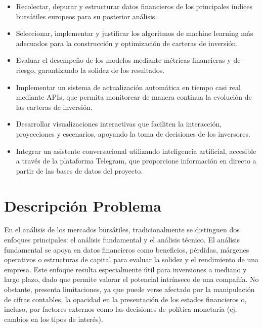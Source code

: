 \documentclass[letterpaper,10pt,spanish]{sphinxmanual}
\begin{document}
\sphinxAtStartPar
{}
\begin{itemize}
\item {} 
\sphinxAtStartPar
Recolectar, depurar y estructurar datos financieros de los principales índices bursátiles europeos para su posterior análisis.

\item {} 
\sphinxAtStartPar
Seleccionar, implementar y justificar los algoritmos de machine learning más adecuados para la construcción y optimización de carteras de inversión.

\item {} 
\sphinxAtStartPar
Evaluar el desempeño de los modelos mediante métricas financieras y de riesgo, garantizando la solidez de los resultados.

\item {} 
\sphinxAtStartPar
Implementar un sistema de actualización automática en tiempo casi real mediante APIs, que permita monitorear de manera continua la evolución de las carteras de inversión.

\item {} 
\sphinxAtStartPar
Desarrollar visualizaciones interactivas que faciliten la interacción, proyecciones y escenarios, apoyando la toma de decisiones de los inversores.

\item {} 
\sphinxAtStartPar
Integrar un asistente conversacional utilizando inteligencia artificial, accesible a través de la plataforma Telegram, que proporcione información en directo a partir de las bases de datos del proyecto.

\end{itemize}

\sphinxstepscope


\chapter{Descripción Problema}
\label{\detokenize{DescripcionProblema:descripcion-problema}}\label{\detokenize{DescripcionProblema::doc}}
\sphinxAtStartPar
En el análisis de los mercados bursátiles, tradicionalmente se distinguen dos enfoques principales: el análisis fundamental y el análisis técnico. El análisis fundamental se apoya en datos financieros como beneficios, pérdidas, márgenes operativos o estructuras de capital para evaluar la solidez y el rendimiento de una empresa. Este enfoque resulta especialmente útil para inversiones a mediano y largo plazo, dado que permite valorar el potencial intrínseco de una compañía. No obstante, presenta limitaciones, ya que puede verse afectado por la manipulación de cifras contables, la opacidad en la presentación de los estados financieros o, incluso, por factores externos como las decisiones de política monetaria (ej. cambios en los tipos de interés).
\end{document}
